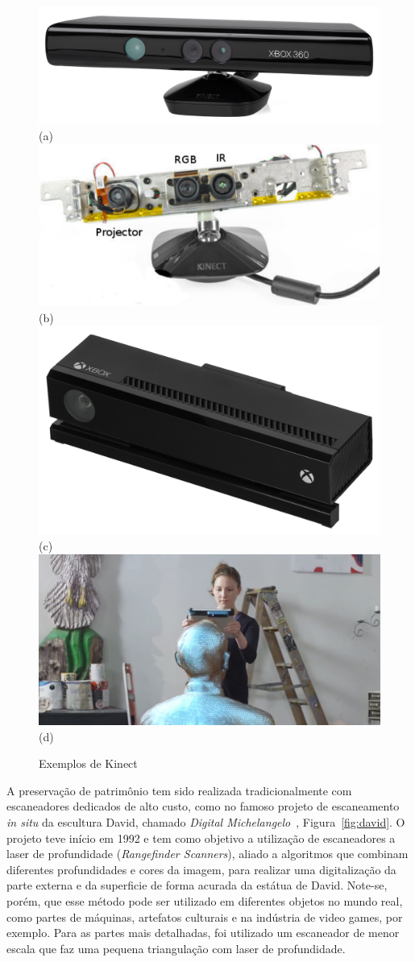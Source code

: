 \begin{figure} [!htbp]
	\centering
	\caption{Exemplos de Kinect}
	\includegraphics[width=0.45\linewidth]{figs/Xbox-360-Kinect-Standalone.png}(a)
	\includegraphics[width=0.45\linewidth]{figs/kinect-internals.pdf}(b)
 	\includegraphics[width=0.45\linewidth]{figs/Xbox-One-Kinect.jpg}(c)
 	\includegraphics[width=0.45\linewidth]{figs/kinect-handheld1.png} (d)
  \label{fig:kinect}
\end{figure}

A preservação de patrimônio tem sido realizada tradicionalmente com escaneadores
dedicados de alto custo, como no famoso projeto de escaneamento \emph{in situ} da escultura
David, chamado \emph{Digital Michelangelo}~\cite{levoy2000digital},
Figura~\ref{fig:david}.  O projeto teve início em 1992 e tem como objetivo a
utilização de escaneadores a laser de profundidade (\emph{Rangefinder Scanners}),
aliado a algoritmos que combinam diferentes profundidades e cores da imagem,
para realizar uma digitalização da parte externa e da superficie de forma
acurada da estátua de David. Note-se, porém, que esse método pode ser utilizado em diferentes
objetos no mundo real, como partes de máquinas, artefatos culturais e na
indústria de video games, por exemplo.  Para as partes mais detalhadas, foi
utilizado um escaneador de menor escala que faz uma pequena triangulação com
laser de profundidade.

